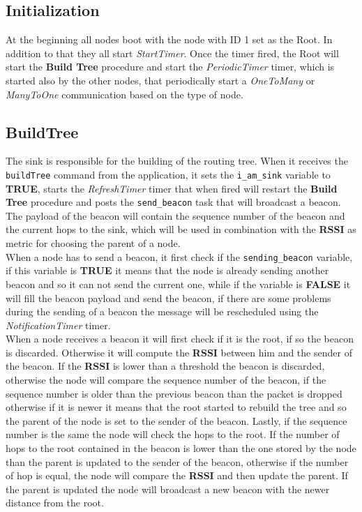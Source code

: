 \documentclass{article}
\begin{document}
\subsection{Initialization}
At the beginning all nodes boot with the node with ID 1 set as the Root. In addition to that they all start \emph{StartTimer}. Once the timer fired, the Root will start the \textbf{Build Tree} procedure and start the \emph{PeriodicTimer} timer, which is started also by the other nodes, that periodically start a \emph{OneToMany} or \emph{ManyToOne} communication based on the type of node.
\subsection{BuildTree}
    The sink is responsible for the building of the routing tree. When it receives the \texttt{buildTree} command from the application, it sets the \texttt{i\_am\_sink} variable to \textbf{TRUE}, starts the \emph{RefreshTimer} timer that when fired will restart the \textbf{Build Tree} procedure and posts the \texttt{send\_beacon} task that will broadcast a beacon. The payload of the beacon will contain the sequence number of the beacon and the current hops to the sink, which will be used in combination with the \textbf{RSSI} as metric for choosing the parent of a node.\\
    When a node has to send a beacon, it first check if the \texttt{sending\_beacon} variable, if this variable is \textbf{TRUE} it means that the node is already sending another beacon and so it can not send the current one, while if the variable is \textbf{FALSE} it will fill the beacon payload and send the beacon, if there are some problems during the sending of a beacon the message will be rescheduled using the \emph{NotificationTimer} timer. \\
    When a node receives a beacon it will first check if it is the root, if so the beacon is discarded. Otherwise it will compute the \textbf{RSSI} between him and the sender of the beacon. If the \textbf{RSSI} is lower than a threshold the beacon is discarded, otherwise the node will compare the sequence number of the beacon, if the sequence number is older than the previous beacon than the packet is dropped otherwise if it is newer it means that the root started to rebuild the tree and so the parent of the node is set to the sender of the beacon. Lastly, if the sequence number is the same the node will check the hops to the root. If the number of hops to the root contained in the beacon is lower than the one stored by the node than the parent is updated to the sender of the beacon, otherwise if the number of hop is equal, the node will compare the \textbf{RSSI} and then update the parent. If the parent is updated the node will broadcast a new beacon with the newer distance from the root.
\end{document}
